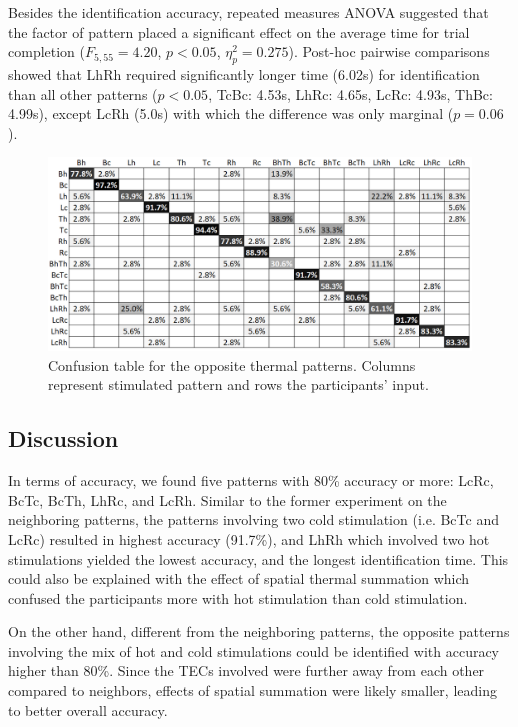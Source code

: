 \documentclass[preprint,12pt]{elsarticle}
\begin{document}
 Besides the identification accuracy, repeated measures ANOVA suggested that the factor of pattern placed a significant effect on the average time for trial completion ($F_{5, 55} = 4.20$, $p < 0.05$, $\eta_p^2 = 0.275$). Post-hoc pairwise comparisons showed that LhRh required significantly longer time (6.02s) for identification than all other patterns ($p < 0.05$, TcBc: 4.53s, LhRc: 4.65s, LcRc: 4.93s, ThBc: 4.99s), except LcRh (5.0s) with which the difference was only marginal ($p = 0.06$).

\begin{figure}[tp]
  \centering
  \includegraphics[width=0.9\columnwidth]{img/fig13.png}
  \caption{Confusion table for the opposite thermal patterns. Columns represent stimulated pattern and rows the participants' input.}
  \label{fig:13}
\end{figure}

\subsection{Discussion}
In terms of accuracy, we found five patterns with 80\% accuracy or more: LcRc, BcTc, BcTh, LhRc, and LcRh. Similar to the former experiment on the neighboring patterns, the patterns involving two cold stimulation (i.e. BcTc and LcRc) resulted in highest accuracy (91.7\%), and LhRh which involved two hot stimulations yielded the lowest accuracy, and the longest identification time. This could also be explained with the effect of spatial thermal summation which confused the participants more with hot stimulation than cold stimulation.

On the other hand, different from the neighboring patterns, the opposite patterns involving the mix of hot and cold stimulations could be identified with accuracy higher than 80\%.
Since the TECs involved were further away from each other compared to neighbors, effects of spatial summation were likely smaller, leading to better overall accuracy.
\end{document}
